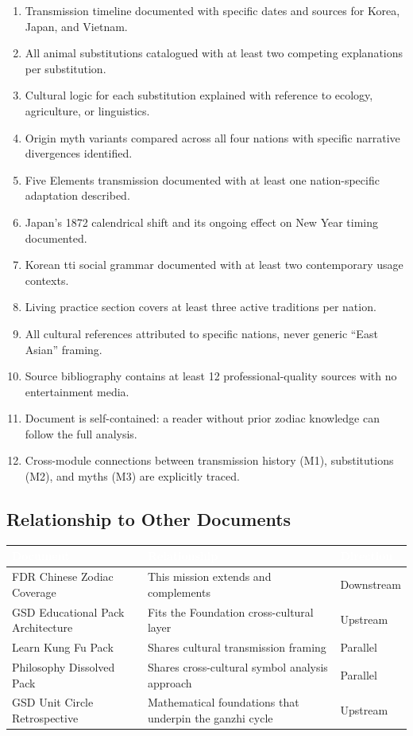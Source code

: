 \documentclass[11pt,letterpaper]{article}
\newcommand{\tableheader}[1]{\textbf{\sffamily\textcolor{white}{#1}}}
\begin{document}
\begin{enumerate}[leftmargin=2em]
  \item Transmission timeline documented with specific dates and sources for Korea, Japan, and Vietnam.
  \item All animal substitutions catalogued with at least two competing explanations per substitution.
  \item Cultural logic for each substitution explained with reference to ecology, agriculture, or linguistics.
  \item Origin myth variants compared across all four nations with specific narrative divergences identified.
  \item Five Elements transmission documented with at least one nation-specific adaptation described.
  \item Japan's 1872 calendrical shift and its ongoing effect on New Year timing documented.
  \item Korean tti social grammar documented with at least two contemporary usage contexts.
  \item Living practice section covers at least three active traditions per nation.
  \item All cultural references attributed to specific nations, never generic ``East Asian'' framing.
  \item Source bibliography contains at least 12 professional-quality sources with no entertainment media.
  \item Document is self-contained: a reader without prior zodiac knowledge can follow the full analysis.
  \item Cross-module connections between transmission history (M1), substitutions (M2), and myths (M3) are explicitly traced.
\end{enumerate}

\subsection{Relationship to Other Documents}

\begin{center}
\begin{tabularx}{\textwidth}{L{4cm}L{5cm}C{3cm}}
\toprule
{}
\tableheader{Document} & \tableheader{Relationship} & \tableheader{Direction} \\
\midrule
FDR Chinese Zodiac Coverage & This mission extends and complements & Downstream \\
GSD Educational Pack Architecture & Fits the Foundation cross-cultural layer & Upstream \\
Learn Kung Fu Pack & Shares cultural transmission framing & Parallel \\
Philosophy Dissolved Pack & Shares cross-cultural symbol analysis approach & Parallel \\
GSD Unit Circle Retrospective & Mathematical foundations that underpin the ganzhi cycle & Upstream \\
\bottomrule
\end{tabularx}
\end{center}
\end{document}
